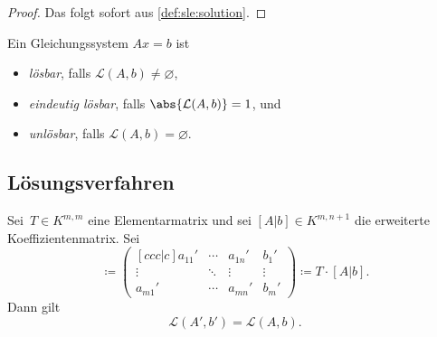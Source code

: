 \documentclass[a4paper]{article}
\begin{document}
\begin{proof}
    Das folgt sofort aus \cref{def:sle:solution}.
\end{proof}

\begin{notation}[Lösbarkeit]
    Ein Gleichungssystem $Ax = b$ ist
    \begin{itemize}
        \item \emph{lösbar}, falls $\mathcal{L}(A,b) \neq \varnothing$,
        \item \emph{eindeutig lösbar}, falls $\abs{\mathcal{L}(A,b)} = 1$, und
        \item \emph{unlösbar}, falls $\mathcal{L}(A,b) = \varnothing$.
    \end{itemize}
\end{notation}

\subsection{Lösungsverfahren}

\begin{lemma}\label{lem:sle:elementary}
    Sei~$T \in K^{m,m}$ eine Elementarmatrix und sei $[A|b] \in K^{m,n+1}$ die erweiterte Koeffizientenmatrix. Sei
    \begin{equation*}
        [A'|b'] \coloneqq \begin{pmatrix}[ccc|c]
            a_{11}' & \cdots & a_{1n}' & b_1'   \\
            \vdots  & \ddots & \vdots  & \vdots \\
            a_{m1}' & \cdots & a_{mn}' & b_m'
        \end{pmatrix}
        \coloneqq T\cdot[A|b].
    \end{equation*}
    Dann gilt
    \begin{equation*}
        \mathcal{L}(A',b') = \mathcal{L}(A,b).
    \end{equation*}
\end{lemma}
\end{document}
